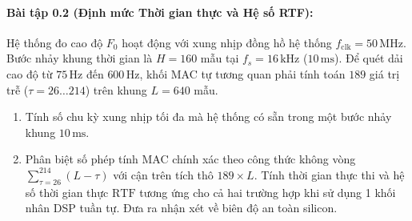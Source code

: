 \paragraph{Bài tập 0.2 (Định mức Thời gian thực và Hệ số RTF):} Hệ thống đo cao độ $F_0$ hoạt động với xung nhịp đồng hồ hệ thống $f_{\mathrm{clk}} = 50\,\text{MHz}$. Bước nhảy khung thời gian là $H = 160$ mẫu tại $f_s = 16\,\text{kHz}$ ($10\,\text{ms}$). Để quét dải cao độ từ $75\,\text{Hz}$ đến $600\,\text{Hz}$, khối MAC tự tương quan phải tính toán $189$ giá trị trễ ($\tau = 26 \ldots 214$) trên khung $L = 640$ mẫu.
\begin{enumerate}[label=\alph*)]
    \item Tính số chu kỳ xung nhịp tối đa mà hệ thống có sẵn trong một bước nhảy khung $10\,\text{ms}$.
    \item Phân biệt số phép tính MAC chính xác theo công thức không vòng $\sum_{\tau=26}^{214} (L - \tau)$ với cận trên tích thô $189 \times L$. Tính thời gian thực thi và hệ số thời gian thực $\text{RTF}$ tương ứng cho cả hai trường hợp khi sử dụng 1 khối nhân DSP tuần tự. Đưa ra nhận xét về biên độ an toàn silicon.
\end{enumerate}


